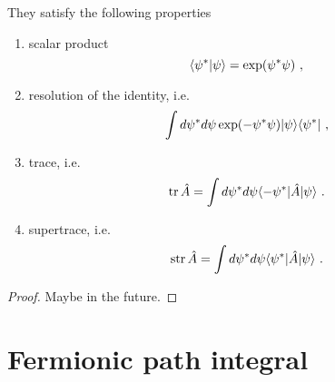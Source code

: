     They satisfy the following properties
    \begin{enumerate}
        \item scalar product
            \begin{equation*}
                \langle\psi^*\vert\psi\rangle = \exp(\psi^* \psi) ~,
            \end{equation*}
        \item resolution of the identity, i.e. 
            \begin{equation*}
                \int d\psi^* d\psi \exp(- \psi^* \psi) \vert\psi\rangle \langle\psi^*\vert ~,
            \end{equation*}
        \item trace, i.e. 
            \begin{equation*}
                \operatorname{tr} \hat A = \int d\psi^* d\psi \langle-\psi^*\vert \hat A \vert\psi\rangle ~.
            \end{equation*}
        \item supertrace, i.e. 
            \begin{equation*}
                \operatorname{str} \hat A = \int d\psi^* d\psi \langle\psi^*\vert \hat A \vert\psi\rangle ~.
            \end{equation*}
    \end{enumerate}
    \begin{proof}
        Maybe in the future.
    \end{proof}

\chapter{Fermionic path integral}

